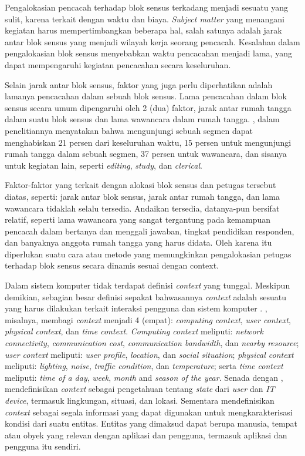 Pengalokasian pencacah terhadap blok sensus terkadang menjadi sesuatu yang sulit, karena terkait dengan waktu dan biaya. \textit{Subject matter} yang menangani kegiatan harus mempertimbangkan beberapa hal, salah satunya adalah jarak antar blok sensus yang menjadi wilayah kerja seorang pencacah. Kesalahan dalam pengalokasian blok sensus menyebabkan waktu pencacahan menjadi lama, yang dapat mempengaruhi kegiatan pencacahan secara keseluruhan.


Selain jarak antar blok sensus, faktor yang juga perlu diperhatikan adalah lamanya pencacahan dalam sebuah blok sensus. Lama pencacahan dalam blok sensus secara umum dipengaruhi oleh 2 (dua) faktor, jarak antar rumah tangga dalam suatu blok sensus dan lama wawancara dalam rumah tangga. \citep{sudman_time_1965}, dalam penelitiannya menyatakan bahwa mengunjungi sebuah segmen dapat menghabiskan 21 persen dari keseluruhan waktu, 15 persen untuk mengunjungi rumah tangga dalam sebuah segmen, 37 persen untuk wawancara, dan sisanya untuk kegiatan lain, seperti \textit{editing}, \textit{study}, dan \textit{clerical}.


Faktor-faktor yang terkait dengan alokasi blok sensus dan petugas tersebut diatas, seperti: jarak antar blok sensus, jarak antar rumah tangga, dan lama wawancara tidaklah selalu tersedia. Andaikan tersedia, datanya-pun bersifat relatif, seperti lama wawancara yang sangat tergantung pada kemampuan pencacah dalam bertanya dan menggali jawaban, tingkat pendidikan responden, dan banyaknya anggota rumah tangga yang harus didata. Oleh karena itu diperlukan suatu cara atau metode yang memungkinkan pengalokasian petugas terhadap blok sensus secara dinamis sesuai dengan context.


Dalam sistem komputer tidak terdapat definisi \textit{context} yang tunggal. Meskipun demikian, sebagian besar definisi sepakat bahwasannya \textit{context} adalah sesuatu yang harus dilakukan terkait interaksi pengguna dan sistem komputer \citep{chen_survey_2000}. \citep{schilit_context-aware_1994}, misalnya, membagi \textit{context} menjadi 4 (empat): \textit{computing context}, \textit{user context}, \textit{physical context}, dan \textit{time context}. \textit{Computing context} meliputi: \textit{network connectivity}, \textit{communication cost}, \textit{communication bandwidth}, dan \textit{nearby resource}; \textit{user context} meliputi: \textit{user profile}, \textit{location}, dan \textit{social situation}; \textit{physical context} meliputi: \textit{lighting}, \textit{noise}, \textit{traffic condition}, dan \textit{temperature}; serta \textit{time context} meliputi: \textit{time of a day}, \textit{week}, \textit{month} and \textit{season of the year}. Senada dengan \citep{schilit_context-aware_1994}, \citep{schmidt_there_1999} mendefinisikan \textit{context} sebagai pengetahuan tentang \textit{state} dari \textit{user} dan \textit{IT device}, termasuk lingkungan, situasi, dan lokasi. Sementara \citep{abowd_towards_1999} mendefinisikan \textit{context} sebagai segala informasi yang dapat digunakan untuk mengkarakterisasi kondisi dari suatu entitas. Entitas yang dimaksud dapat berupa manusia, tempat atau obyek yang relevan dengan aplikasi dan pengguna, termasuk aplikasi dan pengguna itu sendiri. 


